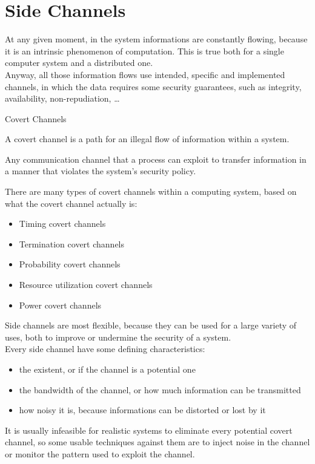 \section{Side Channels}
At any given moment, in the system informations are constantly flowing, because
it is an intrinsic phenomenon of computation. This is true both for a single computer system and a
distributed one.\\
Anyway, all those information flows use intended, specific and implemented channels, in which the
data requires some security guarantees, such as integrity, availability, non-repudiation, \dots\\

\begin{section}{Covert Channels}
  \begin{boxH}
    A covert channel is a path for an illegal flow of information within a system.
  \end{boxH}
  Any communication channel that a process can exploit to transfer information in a manner that
  violates the system’s security policy.

  There are many types of covert channels within a computing system, based on what the covert channel
  actually is:
  \begin{itemize}
    \item Timing covert channels
    \item Termination covert channels
    \item Probability covert channels
    \item Resource utilization covert channels
    \item Power covert channels
  \end{itemize}

  Side channels are most flexible, because they can be used for a large variety of uses, both to
  improve or undermine the security of a system.\\
  Every side channel have some defining characteristics:
  \begin{itemize}
    \item the existent, or if the channel is a potential one
    \item the bandwidth of the channel, or how much information can be transmitted
    \item how noisy it is, because informations can be distorted or lost by it
  \end{itemize}
  It is usually infeasible for realistic systems to eliminate every potential covert
  channel, so some usable techniques against them are to inject noise in the channel or monitor the
  pattern used to exploit the channel.


\end{section}
